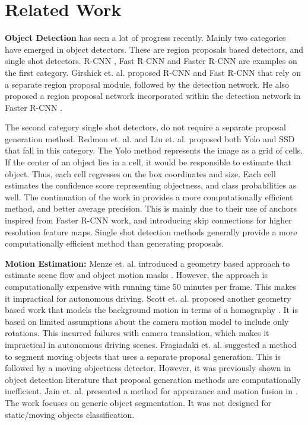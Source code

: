 \documentclass[letterpaper, 10 pt, conference]{ieeeconf}  %
\begin{document}
\section{Related Work}
\label{sec:related}
\textbf{Object Detection} has seen a lot of progress recently. Mainly two categories have emerged in object detectors. These are region proposals based detectors, and single shot detectors. R-CNN \cite{girshick2016region}, Fast R-CNN \cite{girshick2015fast} and Faster R-CNN \cite{ren2015faster} are examples on the first category. Girshick et. al. proposed R-CNN and Fast R-CNN \cite{girshick2016region}\cite{girshick2015fast} that rely on a separate region proposal module, followed by the detection network. He also proposed a region proposal network incorporated within the detection network in Faster R-CNN \cite{ren2015faster}. 

The second category single shot detectors, do not require a separate proposal generation method. Redmon et. al. \cite{redmon2016you}\cite{redmon2016yolo9000} and Liu et. al. \cite{liu2016ssd} proposed both Yolo and SSD that fall in this category. The Yolo \cite{redmon2016you} method represents the image as a grid of cells. If the center of an object lies in a cell, it would be responsible to estimate that object. Thus, each cell regresses on the box coordinates and size. Each cell estimates the confidence score representing objectness, and class probabilities as well. The continuation of the work in \cite{redmon2016yolo9000} provides a more computationally efficient method, and better average precision. This is mainly due to their use of anchors inspired from Faster R-CNN work, and introducing skip connections for higher resolution feature maps. Single shot detection methods generally provide a more computationally efficient method than generating proposals.

\textbf{Motion Estimation:} Menze et. al. introduced a geometry based approach to estimate scene flow and object motion masks \cite{menze2015object}. However, the approach is computationally expensive with running time 50 minutes per frame. This makes it impractical for autonomous driving. Scott et. al. proposed another geometry based work that models the background motion in terms of a homography \cite{scott2017motion}. It is based on limited assumptions about the camera motion model to include only rotations. This incurred failures with camera translation, which makes it impractical in autonomous driving scenes. Fragiadaki et. al. suggested a method to segment moving objects \cite{fragkiadaki2015learning} that uses a separate proposal generation. This is followed by a moving objectness detector. However, it was previously shown in object detection literature that proposal generation methods are computationally inefficient. Jain et. al. presented a method for appearance and motion fusion in \cite{jain2017fusionseg}. The work focuses on generic object segmentation. It was not designed for static/moving objects classification. 
\end{document}
